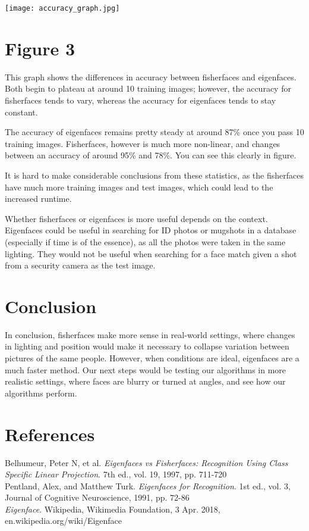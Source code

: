 \documentclass{tufte-handout}
\begin{document}
\begin{marginfigure}
\texttt{[image: accuracy\_graph.jpg]}
\section{Figure 3}
This graph shows the differences in accuracy between fisherfaces and eigenfaces. Both begin to plateau at around 10 training images; however, the accuracy for fisherfaces tends to vary, whereas the accuracy for eigenfaces tends to stay constant.

\end{marginfigure}

The accuracy of eigenfaces remains pretty steady at around 87\% once you pass 10 training images. Fisherfaces, however is much more non-linear, and changes between an accuracy of around 95\% and 78\%. You can see this clearly in figure.

It is hard to make considerable conclusions from these statistics, as the fisherfaces have much more training images and test images, which could lead to the increased runtime. 

Whether fisherfaces or eigenfaces is more useful depends on the context. Eigenfaces could be useful in searching for ID photos or mugshots in a database (especially if time is of the essence), as all the photos were taken in the same lighting. They would not be useful when searching for a face match given a shot from a security camera as the test image. 

\section{Conclusion}
In conclusion, fisherfaces make more sense in real-world settings, where changes in lighting and position would make it necessary to collapse variation between pictures of the same people. However, when conditions are ideal, eigenfaces are a much faster method. Our next steps would be testing our algorithms in more realistic settings, where faces are blurry or turned at angles, and see how our algorithms perform. 
\break

\section{References}
\indent Belhumeur, Peter N, et al. \textit{Eigenfaces vs Fisherfaces: Recognition Using Class Specific Linear 
Projection}. 7th ed., vol. 19, 1997, pp. 711-720 \\

Pentland, Alex, and Matthew Turk. \textit{Eigenfaces for Recognition}. 1st ed., vol. 3, Journal of Cognitive Neuroscience, 1991, pp. 72-86 \\

\textit{Eigenface}. Wikipedia, Wikimedia Foundation, 3 Apr. 2018, en.wikipedia.org/wiki/Eigenface \\
\end{document}

